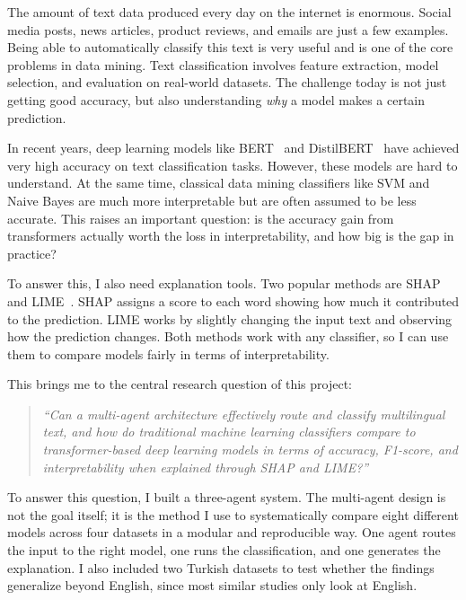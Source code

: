 \documentclass[conference]{IEEEtran}
\begin{document}
The amount of text data produced every day on the internet is enormous. Social media posts,
news articles, product reviews, and emails are just a few examples. Being able to
automatically classify this text is very useful and is one of the core problems in data
mining. Text classification involves feature extraction, model selection, and evaluation on
real-world datasets. The challenge today is not just getting good accuracy, but also
understanding \textit{why} a model makes a certain prediction.

In recent years, deep learning models like BERT~\cite{b2} and DistilBERT~\cite{b3} have
achieved very high accuracy on text classification tasks. However, these models are hard to
understand. At the same time, classical data mining classifiers like SVM and Naive Bayes are
much more interpretable but are often assumed to be less accurate. This raises an important
question: is the accuracy gain from transformers actually worth the loss in interpretability,
and how big is the gap in practice?

To answer this, I also need explanation tools. Two popular methods are SHAP~\cite{b4} and
LIME~\cite{b5}. SHAP assigns a score to each word showing how much it contributed to the
prediction. LIME works by slightly changing the input text and observing how the prediction
changes. Both methods work with any classifier, so I can use them to compare models fairly
in terms of interpretability.

This brings me to the central research question of this project:

\begin{quote}
\textit{``Can a multi-agent architecture effectively route and classify multilingual text,
and how do traditional machine learning classifiers compare to transformer-based deep
learning models in terms of accuracy, F1-score, and interpretability when explained through
SHAP and LIME?''}
\end{quote}

To answer this question, I built a three-agent system. The multi-agent design is not the
goal itself; it is the method I use to systematically compare eight different models
across four datasets in a modular and reproducible way. One agent routes the input to the
right model, one runs the classification, and one generates the explanation. I also included
two Turkish datasets to test whether the findings generalize beyond English, since most
similar studies only look at English.
\end{document}
